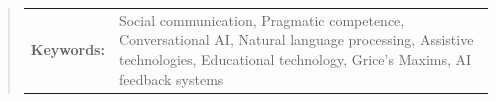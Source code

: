 \begin{abstract}
\begin{flushleft}
\begin{tabular}{lp{4.25in}}
\hspace{-0.5em}\textbf{Keywords:}\hspace{0.25em} & Social communication, Pragmatic competence, Conversational AI, Natural language processing, Assistive technologies, Educational technology, Grice’s Maxims, AI feedback systems
\end{tabular}
\end{flushleft}
\end{abstract}
